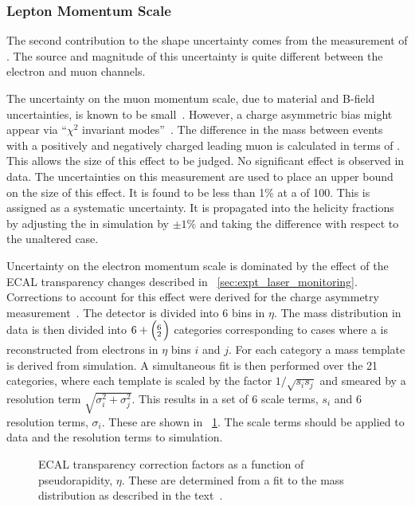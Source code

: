 \subsubsection{Lepton Momentum Scale}
The second contribution to the \LP shape uncertainty comes from the measurement
of \Ptl. The source and magnitude of this uncertainty is quite different between
the electron and muon channels.

The uncertainty on the muon momentum scale, due to material and B-field
uncertainties, is known to be small~\cite{mu_align_pas}. However, a charge
asymmetric \Pt bias might appear via ``$\chi^2$ invariant modes''~\cite[section
2.4]{matthias_edelhoff_thesis}. The difference in the \PZ mass between events
with a positively and negatively charged leading muon is calculated in terms of
\Ptl. This allows the size of this effect to be judged. No significant effect
is observed in data. The uncertainties on this measurement are used to place an upper
bound on the size of this effect. It is found to be less than 1\% at a \Ptmu of
\unit{100}{\GeV}. This is assigned as a systematic uncertainty. It is propagated
into the helicity fractions by adjusting the \Ptmu in simulation by $\pm 1\%$
and taking the difference with respect to the unaltered case.

Uncertainty on the electron momentum scale is dominated by the effect of the
\ac{ECAL} transparency changes described in
\sec~\ref{sec:expt_laser_monitoring}. Corrections to account for this effect
were derived for the \PW charge asymmetry
measurement~\cite{w_charge_asymmetry}. The detector is divided into 6 bins in
$\eta$. The \Zee mass distribution in data is then divided into $6+\Bigl(\negthinspace\begin{smallmatrix}6\\2\end{smallmatrix}\Bigr)$
categories corresponding to cases where a \PZ is reconstructed from electrons in
$\eta$ bins $i$ and $j$.  For each category a mass template is derived from
simulation. A simultaneous fit is then performed over the 21 categories, where
each template is scaled by the factor $1/\sqrt{s_is_j}$ and smeared by a
resolution term $\sqrt{\sigma_i^2 + \sigma_j^2}$. This results in a set of 6
scale terms, $s_i$ and 6 resolution terms, $\sigma_i$. These are shown in
\fig~\ref{fig:wpol_ecal_transp_corr}.  The scale terms should be applied to
data and the resolution terms to simulation.

\begin{figure}[h!]
  \centering
  \quad
  \quad
  \caption[\acs{ECAL} transparency correction factors as a function of
  $\eta$]{\ac{ECAL} transparency correction factors as a function of
    pseudorapidity, $\eta$. These are determined from a fit to the \PZ mass distribution
    as described in the text~\cite{w_charge_asymmetry_an}.}
\label{fig:wpol_ecal_transp_corr}
\end{figure}

